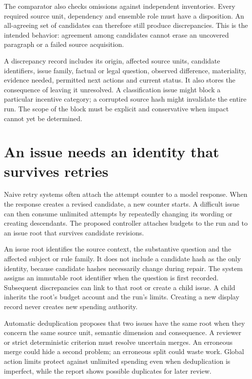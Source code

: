 \documentclass[12pt,a4paper,oneside,openany]{book}
\begin{document}
The comparator also checks omissions against independent inventories. Every
required source unit, dependency and ensemble role must have a disposition. An
all-agreeing set of candidates can therefore still produce discrepancies. This
is the intended behavior: agreement among candidates cannot erase an uncovered
paragraph or a failed source acquisition.

A discrepancy record includes its origin, affected source units, candidate
identifiers, issue family, factual or legal question, observed difference,
materiality, evidence needed, permitted next actions and current status. It also
stores the consequence of leaving it unresolved. A classification issue might
block a particular incentive category; a corrupted source hash might invalidate
the entire run. The scope of the block must be explicit and conservative when
impact cannot yet be determined.

\section{An issue needs an identity that survives retries}
\label{merge:M06:06}


Naive retry systems often attach the attempt counter to a model response. When
the response creates a revised candidate, a new counter starts. A difficult issue
can then consume unlimited attempts by repeatedly changing its wording or
creating descendants. The proposed controller attaches budgets to the run and to
an issue root that survives candidate revisions.

An issue root identifies the source context, the substantive question and the
affected subject or rule family. It does not include a candidate hash as the only
identity, because candidate hashes necessarily change during repair. The system
assigns an immutable root identifier when the question is first recorded.
Subsequent discrepancies can link to that root or create a child issue. A child
inherits the root's budget account and the run's limits. Creating a new display
record never creates new spending authority.

Automatic deduplication proposes that two issues have the same root when they
concern the same source unit, semantic dimension and consequence. A reviewer or
strict deterministic criterion must resolve uncertain merges. An erroneous merge
could hide a second problem; an erroneous split could waste work. Global action
limits protect against unlimited spending even when deduplication is imperfect,
while the report shows possible duplicates for later review.
\end{document}
